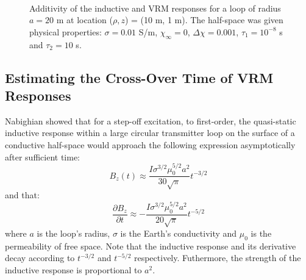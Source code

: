 \documentclass[journal]{IEEEtran}  %
\begin{document}
\begin{figure}[!t]
    \centering
    \vspace{-10pt}
    \\
    \caption{Additivity of the inductive
    and VRM responses for a loop of radius $a=20$ m at location ($\rho,z$) = (10 m, 1 m).
    The half-space was given physical properties: $\sigma = 0.01$ S/m, $\chi_{\infty} = 0$, $\Delta \chi = 0.001$, $\tau_1 = 10^{-8}$ s and $\tau_2 = 10$ s.}
    \label{figVRMrespZadd}
\end{figure}
%


\subsection{Estimating the Cross-Over Time of VRM Responses}
\label{secIndVsVRM}
Nabighian \cite{Nabighian1979} showed that for a step-off
excitation, to first-order, the quasi-static inductive response
within a large circular transmitter loop on the surface of a
conductive half-space would approach the following expression
asymptotically after sufficient time:
\begin{equation}
\label{eqKaufmanB}
B_z(t) \approx \frac{I \sigma^{3/2} \mu_0^{5/2} a^2}{30 \sqrt{\pi}} t^{-3/2}
\end{equation}
and that:
\begin{equation}
\label{eqKaufmandBdt}
\frac{\partial B_z}{\partial t} \approx -\frac{ I \sigma^{3/2} \mu_0^{5/2} a^2}{20 \sqrt{\pi}} t^{-5/2}
\end{equation}
where $a$ is the loop's radius, $\sigma$ is the Earth's conductivity
and $\mu_0$ is the permeability of free space. Note that the
inductive response and its derivative decay according to $t^{-3/2}$
and $t^{-5/2}$ respectively. Futhermore, the strength of the
inductive response is proportional to $a^2$.
\end{document}
